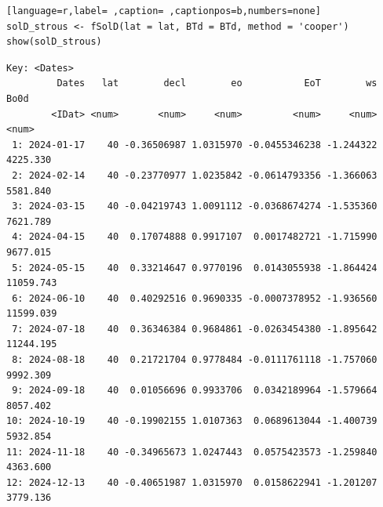 \begin{lstlisting}[language=r,label= ,caption= ,captionpos=b,numbers=none]
solD_strous <- fSolD(lat = lat, BTd = BTd, method = 'cooper')
show(solD_strous)
\end{lstlisting}

\begin{verbatim}
Key: <Dates>
         Dates   lat        decl        eo           EoT        ws      Bo0d
        <IDat> <num>       <num>     <num>         <num>     <num>     <num>
 1: 2024-01-17    40 -0.36506987 1.0315970 -0.0455346238 -1.244322  4225.330
 2: 2024-02-14    40 -0.23770977 1.0235842 -0.0614793356 -1.366063  5581.840
 3: 2024-03-15    40 -0.04219743 1.0091112 -0.0368674274 -1.535360  7621.789
 4: 2024-04-15    40  0.17074888 0.9917107  0.0017482721 -1.715990  9677.015
 5: 2024-05-15    40  0.33214647 0.9770196  0.0143055938 -1.864424 11059.743
 6: 2024-06-10    40  0.40292516 0.9690335 -0.0007378952 -1.936560 11599.039
 7: 2024-07-18    40  0.36346384 0.9684861 -0.0263454380 -1.895642 11244.195
 8: 2024-08-18    40  0.21721704 0.9778484 -0.0111761118 -1.757060  9992.309
 9: 2024-09-18    40  0.01056696 0.9933706  0.0342189964 -1.579664  8057.402
10: 2024-10-19    40 -0.19902155 1.0107363  0.0689613044 -1.400739  5932.854
11: 2024-11-18    40 -0.34965673 1.0247443  0.0575423573 -1.259840  4363.600
12: 2024-12-13    40 -0.40651987 1.0315970  0.0158622941 -1.201207  3779.136
\end{verbatim}

